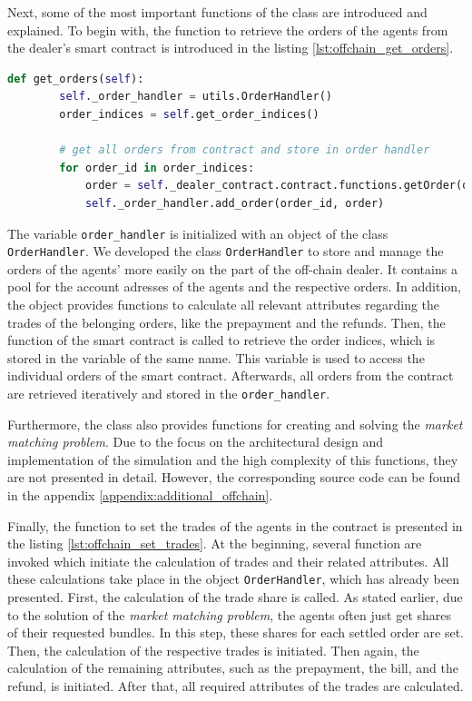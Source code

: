 Next, some of the most important functions of the class are introduced and explained.
To begin with, the function to retrieve the orders of the agents from the dealer's 
smart contract is introduced in the listing \ref{lst:offchain_get_orders}.

\begin{lstlisting}[float=htbp, label=lst:offchain_get_orders, caption=Retrievement of orders, language=Python]
    def get_orders(self):
        self._order_handler = utils.OrderHandler()
        order_indices = self.get_order_indices()

        # get all orders from contract and store in order handler
        for order_id in order_indices:
            order = self._dealer_contract.contract.functions.getOrder(order_id).call()
            self._order_handler.add_order(order_id, order)
\end{lstlisting}

The variable \verb|order_handler| is initialized with an object of the class \verb|OrderHandler|.
We developed the class \verb|OrderHandler| to store and manage the orders of the agents' more easily
on the part of the off-chain dealer.
It contains a pool for the account adresses of the agents and the 
respective orders. In addition, the object provides functions to 
calculate all relevant attributes regarding the trades of the belonging orders, 
like the prepayment and the refunds.
Then, the function of the smart contract is called to retrieve the order indices,
which is stored in the variable of the same name. This variable is used to 
access the individual orders of the smart contract.
Afterwards, all orders from the contract are retrieved iteratively and stored in the \verb|order_handler|.

Furthermore, the class also provides functions for creating and solving the \textit{market matching problem}.
Due to the focus on the architectural design and implementation of the simulation and the high complexity
of this functions, they are not presented in detail. However, the corresponding source code can be found in the appendix \ref{appendix:additional_offchain}.

Finally, the function to set the trades of the agents in the contract is presented in the listing \ref{lst:offchain_set_trades}.
At the beginning, several function are invoked which initiate the calculation of trades and their related attributes.
All these calculations take place in the object \verb|OrderHandler|, which has already been presented.
First, the calculation of the trade share is called. As stated earlier, due to the solution of the 
\textit{market matching problem}, the agents often just get shares of their requested bundles. In this step,
these shares for each settled order are set. Then, the calculation of the respective trades is initiated.
Then again, the calculation of the remaining attributes, such as the prepayment, the bill, and the refund,
is initiated. 
After that, all required attributes of the trades are calculated.


